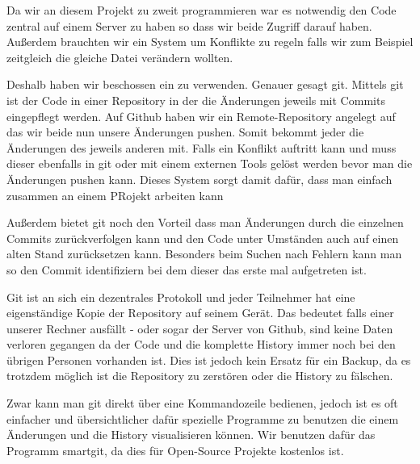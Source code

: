 
Da wir an diesem Projekt zu zweit programmieren war es notwendig den Code zentral auf einem Server zu haben so dass wir beide Zugriff darauf haben.
Außerdem brauchten wir ein System um Konflikte zu regeln falls wir zum Beispiel zeitgleich die gleiche Datei verändern wollten.

Deshalb haben wir beschossen ein  zu verwenden. Genauer gesagt git. Mittels git ist der Code in einer Repository in der die Änderungen jeweils mit Commits eingepflegt werden. Auf Github haben wir ein Remote-Repository angelegt auf das wir beide nun unsere Änderungen pushen. Somit bekommt jeder die Änderungen des jeweils anderen mit. Falls ein Konflikt auftritt kann und muss dieser ebenfalls in git oder mit einem externen Tools gelöst werden bevor man die Änderungen pushen kann. Dieses System sorgt damit dafür, dass man einfach zusammen an einem PRojekt arbeiten kann


Außerdem bietet git noch den Vorteil dass man Änderungen durch die einzelnen Commits zurückverfolgen kann und den Code unter Umständen auch auf einen alten Stand zurücksetzen kann. Besonders beim Suchen nach Fehlern kann man so den Commit identifiziern bei dem dieser das erste mal aufgetreten ist. 

Git ist an sich ein dezentrales Protokoll und jeder Teilnehmer hat eine eigenständige Kopie der Repository auf seinem Gerät. Das bedeutet falls einer unserer Rechner ausfällt - oder sogar der Server von Github, sind keine Daten verloren gegangen da der Code und die komplette History immer noch bei den übrigen Personen vorhanden ist. Dies ist jedoch kein Ersatz für ein Backup, da es trotzdem möglich ist die Repository zu zerstören oder die History zu fälschen.

Zwar kann man git direkt über eine Kommandozeile bedienen, jedoch ist es oft einfacher und übersichtlicher dafür spezielle Programme zu benutzen die einem Änderungen und die History visualisieren können. Wir benutzen dafür das Programm smartgit, da dies für Open-Source Projekte kostenlos ist.

